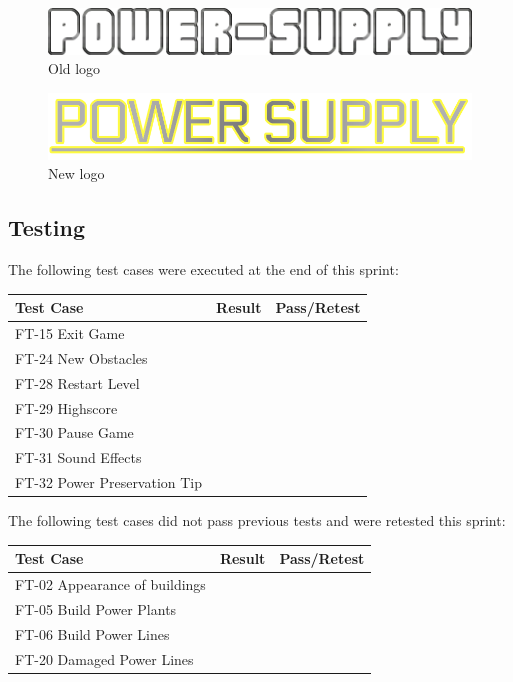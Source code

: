 		\begin{figure}
			\centering
			\includegraphics[scale=0.4]{pictures/logo2.png}
			\caption{Old logo}
		\end{figure}

		\begin{figure}
			\centering
			\includegraphics[scale=0.4]{pictures/newLogo.png}
			\caption{New logo}
		\end{figure}


\subsection{Testing}

	The following test cases were executed at the end of this sprint:


	\begin{tabular}{| p{3cm} | p{7cm} | p{2cm} |}
		\hline
		\rowcolor{lightgray}
		{\bf Test Case} & {\bf Result} & {\bf Pass/Retest} \\ \hline
		FT-15 Exit Game &  & \\ \hline
		FT-24 New Obstacles &  & \\ \hline
		FT-28 Restart Level &  & \\ \hline
		FT-29 Highscore &  & \\ \hline
		FT-30 Pause Game &  & \\ \hline
		FT-31 Sound Effects &  & \\ \hline
		FT-32 Power Preservation Tip &  & \\ \hline
	\end{tabular}

	The following test cases did not pass previous tests and were retested this sprint:

	\begin{tabular}{| p{3cm} | p{7cm} | p{2cm} |}
		\hline
		\rowcolor{lightgray}
		{\bf Test Case} & {\bf Result} & {\bf Pass/Retest} \\ \hline
		FT-02 Appearance of buildings & & \\ \hline
		FT-05 Build Power Plants & & \\ \hline
		FT-06 Build Power Lines & & \\ \hline
		FT-20 Damaged Power Lines & & \\ \hline
	\end{tabular}

